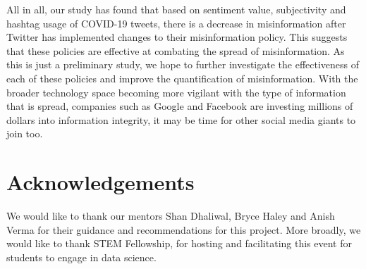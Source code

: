 \documentclass[10pt,twocolumn,letterpaper]{article}
\begin{document}
All in all, our study has found that based on sentiment value, subjectivity and hashtag usage of COVID-19 tweets, there is a decrease in misinformation after Twitter has implemented changes to their misinformation policy. This suggests that these policies are effective at combating the spread of misinformation. As this is just a preliminary study, we hope to further investigate the effectiveness of each of these policies and improve the quantification of misinformation. With the broader technology space becoming more vigilant with the type of information that is spread, companies such as Google and Facebook are investing millions of dollars into information integrity, it may be time for other social media giants to join too.


\section*{Acknowledgements}
We would like to thank our mentors Shan Dhaliwal, Bryce Haley and Anish Verma for their guidance and recommendations for this project. More broadly, we would like to thank STEM Fellowship, for hosting and facilitating this event for students to engage in data science.


\end{document}
